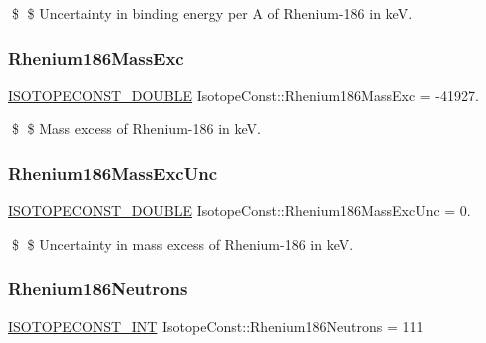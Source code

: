 \$ \$ Uncertainty in binding energy per A of Rhenium-\/186 in keV. \mbox{\label{group___isotope_const-_rhenium-_re186_ga3d45e7752b94a59f6e7998d04e1d72b9}} 
\subsubsection{\texorpdfstring{Rhenium186\+Mass\+Exc}{Rhenium186MassExc}}
{\footnotesize\ttfamily \mbox{\hyperlink{group___isotope_const-_macros_ga8f45a7272ce02c0b4c65c44636ed719a}{I\+S\+O\+T\+O\+P\+E\+C\+O\+N\+S\+T\+\_\+\+D\+O\+U\+B\+LE}} Isotope\+Const\+::\+Rhenium186\+Mass\+Exc = -\/41927.}

\$ \$ Mass excess of Rhenium-\/186 in keV. \mbox{\label{group___isotope_const-_rhenium-_re186_ga6314c7330a7841b097d086d27abfc71e}} 
\subsubsection{\texorpdfstring{Rhenium186\+Mass\+Exc\+Unc}{Rhenium186MassExcUnc}}
{\footnotesize\ttfamily \mbox{\hyperlink{group___isotope_const-_macros_ga8f45a7272ce02c0b4c65c44636ed719a}{I\+S\+O\+T\+O\+P\+E\+C\+O\+N\+S\+T\+\_\+\+D\+O\+U\+B\+LE}} Isotope\+Const\+::\+Rhenium186\+Mass\+Exc\+Unc = 0.}

\$ \$ Uncertainty in mass excess of Rhenium-\/186 in keV. \mbox{\label{group___isotope_const-_rhenium-_re186_ga30ad8671df1df2496d15b8abe41889d5}} 
\subsubsection{\texorpdfstring{Rhenium186\+Neutrons}{Rhenium186Neutrons}}
{\footnotesize\ttfamily \mbox{\hyperlink{group___isotope_const-_macros_ga5f18360b3e99483a35c32d789e62621c}{I\+S\+O\+T\+O\+P\+E\+C\+O\+N\+S\+T\+\_\+\+I\+NT}} Isotope\+Const\+::\+Rhenium186\+Neutrons = 111}

